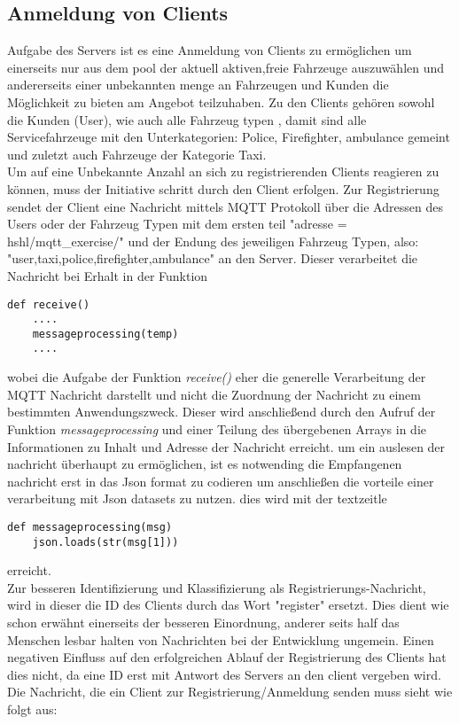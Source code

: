 \documentclass[conference]{IEEEtran}
\begin{document}
\subsection{Anmeldung von Clients}
Aufgabe des Servers ist es eine Anmeldung von Clients zu ermöglichen um  einerseits nur aus dem pool der aktuell aktiven,freie Fahrzeuge  auszuwählen und andererseits einer unbekannten menge an Fahrzeugen und Kunden die Möglichkeit zu bieten am Angebot teilzuhaben. Zu den Clients gehören sowohl die Kunden (User), wie auch alle Fahrzeug typen , damit sind alle Servicefahrzeuge mit den Unterkategorien: Police, Firefighter, ambulance gemeint und zuletzt auch Fahrzeuge der Kategorie Taxi.\\ 
Um auf eine Unbekannte Anzahl an sich zu registrierenden Clients reagieren zu können, muss der Initiative schritt durch den Client erfolgen. Zur Registrierung sendet der Client eine Nachricht mittels MQTT Protokoll über die Adressen des Users oder der Fahrzeug Typen mit dem ersten teil \textsf{"adresse = hshl/mqtt\_exercise/"} und der Endung des jeweiligen Fahrzeug Typen, also: \textsf{"user,taxi,police,firefighter,ambulance"} an den Server. Dieser verarbeitet die Nachricht bei Erhalt in der Funktion  
\begin{lstlisting}
def receive()
	....
	messageprocessing(temp)
	....
\end{lstlisting}
 wobei die Aufgabe der Funktion  \textit{receive()} eher die generelle Verarbeitung der MQTT Nachricht darstellt und nicht die Zuordnung der Nachricht zu einem bestimmten Anwendungszweck. 
Dieser wird anschließend durch den Aufruf der Funktion \textit{messageprocessing} und einer Teilung des übergebenen Arrays in die Informationen zu Inhalt und Adresse der Nachricht erreicht.
um ein auslesen der nachricht überhaupt zu ermöglichen, ist es notwending die Empfangenen nachricht erst in das Json format zu codieren um anschließen die vorteile einer verarbeitung mit Json datasets zu nutzen. dies wird mit der textzeitle \begin{lstlisting}
def messageprocessing(msg)
	json.loads(str(msg[1]))
\end{lstlisting}
 erreicht.\\
 Zur besseren Identifizierung und Klassifizierung als Registrierungs-Nachricht, wird in dieser die ID des Clients durch das Wort "register" ersetzt. Dies dient wie schon erwähnt einerseits der besseren Einordnung, anderer seits half das Menschen lesbar halten von Nachrichten bei der Entwicklung ungemein. Einen negativen Einfluss auf den erfolgreichen Ablauf der Registrierung des Clients hat dies nicht, da eine ID erst mit Antwort des Servers an den client vergeben wird. Die Nachricht, die ein Client zur Registrierung/Anmeldung senden muss sieht wie folgt aus:
\end{document}
